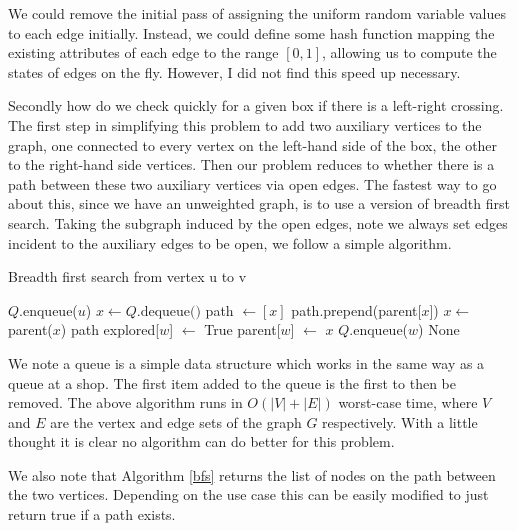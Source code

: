 \documentclass[a4paper,11pt]{article}
\theoremstyle{definition}
\begin{document}
We could remove the initial pass of assigning the uniform random variable values to each edge initially. Instead, we could define some hash function mapping the existing attributes of each edge to the range $[0,1]$, allowing us to compute the states of edges on the fly. However, I did not find this speed up necessary.

Secondly how do we check quickly for a given box if there is a left-right crossing. The first step in simplifying this problem to add two auxiliary vertices to the graph, one connected to every vertex on the left-hand side of the box, the other to the right-hand side vertices. Then our problem reduces to whether there is a path between these two auxiliary vertices via open edges.
The fastest way to go about this, since we have an unweighted graph, is to use a version of breadth first search. Taking the subgraph induced by the open edges, note we always set edges incident to the auxiliary edges to be open, we follow a simple algorithm.
\begin{algorithm}
	\caption{Breadth first search from vertex u to v}\label{bfs}
	\begin{algorithmic}[1]
	\State $Q$.enqueue($u$)
		\State $x \gets Q\text{.dequeue()}$
		 
			\State path $\gets [x]$
				\State path.prepend(parent[$x$])
				\State $x \gets$ parent($x$)
			\EndWhile
			\State
			\Return path
		\EndIf
				\State explored[$w$] $\gets$ True
				\State parent[$w$] $\gets$ $x$
				\State $Q$.enqueue($w$)
			\EndIf
		\EndFor
	\EndWhile
	 \Return None
	\EndIf
	\EndProcedure
	\end{algorithmic}
	\end{algorithm}

We note a queue is a simple data structure which works in the same way as a queue at a shop. The first item added to the queue is the first to then be removed.
The above algorithm runs in $O(|V|+|E|)$ worst-case time, where $V$ and $E$ are the vertex and edge sets of the graph $G$ respectively. With a little thought it is clear no algorithm can do better for this problem. 

We also note that Algorithm \ref*{bfs} returns the list of nodes on the path between the two vertices. Depending on the use case this can be easily modified to just return true if a path exists. 
\end{document}
